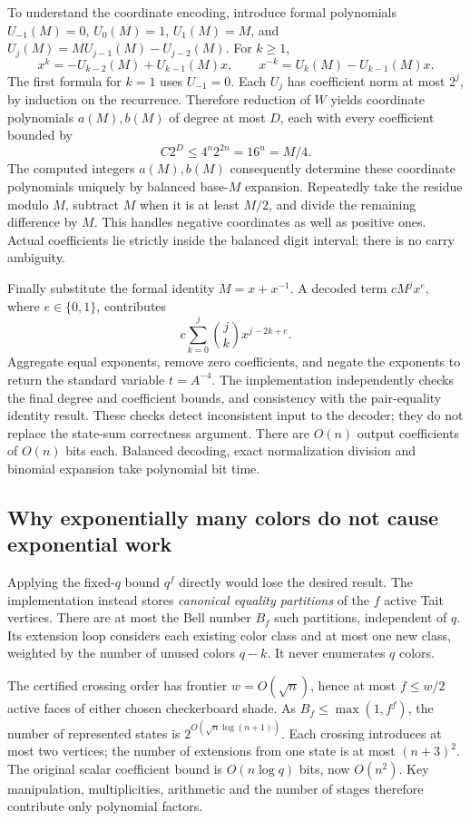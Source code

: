 To understand the coordinate encoding, introduce formal polynomials
$U_{-1}(M)=0$, $U_0(M)=1$, $U_1(M)=M$, and
$U_j(M)=M U_{j-1}(M)-U_{j-2}(M)$.  For $k\ge1$,
\[
 x^k=-U_{k-2}(M)+U_{k-1}(M)x,\qquad
 x^{-k}=U_k(M)-U_{k-1}(M)x.
\]
The first formula for $k=1$ uses $U_{-1}=0$.
Each $U_j$ has coefficient norm at most $2^j$, by induction on the
recurrence.  Therefore reduction of $W$ yields coordinate polynomials
$a(M),b(M)$ of degree at most $D$, each with every coefficient bounded by
\[
 C 2^D\le 4^n 2^{2n}=16^n=M/4.
\]
The computed integers $a(M),b(M)$ consequently determine these coordinate
polynomials uniquely by balanced base-$M$ expansion.  Repeatedly take the
residue modulo $M$, subtract $M$ when it is at least $M/2$, and divide the
remaining difference by $M$.  This handles negative coordinates as well as
positive ones.  Actual coefficients lie strictly inside the balanced digit
interval; there is no carry ambiguity.

Finally substitute the formal identity $M=x+x^{-1}$.  A decoded term
$cM^j x^e$, where $e\in\{0,1\}$, contributes
\[
 c\sum_{k=0}^j\binom jk x^{j-2k+e}.
\]
Aggregate equal exponents, remove zero coefficients, and negate the exponents
to return the standard variable $t=A^{-4}$.  The implementation independently
checks the final degree and coefficient bounds, and consistency with the
pair-equality identity result.  These checks detect inconsistent input to the
decoder; they do not replace the state-sum correctness argument.
There are $O(n)$ output coefficients of $O(n)$ bits each.  Balanced decoding,
exact normalization division and binomial expansion take polynomial bit time.

\subsection{Why exponentially many colors do not cause exponential work}

Applying the fixed-$q$ bound $q^f$ directly would lose the desired result.
The implementation instead stores \emph{canonical equality partitions} of
the $f$ active Tait vertices.  There are at most the Bell number $B_f$ such
partitions, independent of $q$.  Its extension loop considers each existing
color class and at most one new class, weighted by the number of unused
colors $q-k$.  It never enumerates $q$ colors.

The certified crossing order has frontier $w=O(\sqrt n)$, hence at most
$f\le w/2$ active faces of either chosen checkerboard shade.  As
$B_f\le\max(1,f^f)$, the number of represented states is
$2^{O(\sqrt n\log(n+1))}$.  Each crossing introduces at most two vertices;
the number of extensions from one state is at most $(n+3)^2$.
The original scalar coefficient bound is $O(n\log q)$ bits, now $O(n^2)$.
Key manipulation, multiplicities, arithmetic and the number of stages
therefore contribute only polynomial factors.

